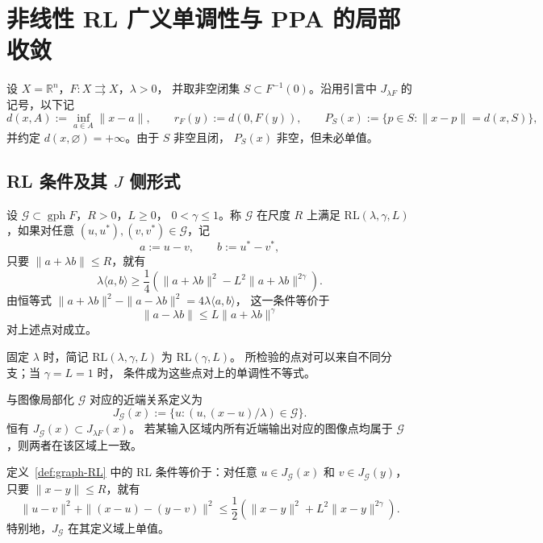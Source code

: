 \section{非线性 RL 广义单调性与 PPA 的局部收敛}
\label{sec:deterministic-rleb-spine}

设 $X=\mathbb R^n$，$F:X\rightrightarrows X$，$\lambda>0$，
并取非空闭集 $S\subset F^{-1}(0)$。沿用引言中
$J_{\lambda F}$ 的记号，以下记
\[
 d(x,A):=\inf_{a\in A}\|x-a\|,
 \qquad
 r_F(y):=d(0,F(y)),
 \qquad
 P_S(x):=\{p\in S:\|x-p\|=d(x,S)\},
\]
并约定 $d(x,\varnothing)=+\infty$。由于 $S$ 非空且闭，
$P_S(x)$ 非空，但未必单值。

\subsection{RL 条件及其 \texorpdfstring{$J$}{J} 侧形式}

\begin{definition}[RL 广义单调性]
\label{def:graph-RL}
设 $\mathcal G\subset\operatorname{gph}F$，$R>0$，$L\geq0$，
$0<\gamma\leq1$。称 $\mathcal G$ 在尺度 $R$ 上满足
$\mathrm{RL}(\lambda,\gamma,L)$，如果对任意
$(u,u^*),(v,v^*)\in\mathcal G$，记
\[
 a:=u-v,\qquad b:=u^*-v^*,
\]
只要 $\|a+\lambda b\|\leq R$，就有
\begin{equation}
\label{eq:graph-RL}
 \lambda\langle a,b\rangle
 \geq\frac14\left(
   \|a+\lambda b\|^2-L^2\|a+\lambda b\|^{2\gamma}
 \right).
\end{equation}
由恒等式
$\|a+\lambda b\|^2-\|a-\lambda b\|^2
 =4\lambda\langle a,b\rangle$，
这一条件等价于
\begin{equation}
\label{eq:power-RL}
 \|a-\lambda b\|\leq L\|a+\lambda b\|^\gamma
\end{equation}
对上述点对成立。
\end{definition}

固定 $\lambda$ 时，简记
$\mathrm{RL}(\lambda,\gamma,L)$ 为 $\mathrm{RL}(\gamma,L)$。
所检验的点对可以来自不同分支；当 $\gamma=L=1$ 时，
条件成为这些点对上的单调性不等式。

与图像局部化 $\mathcal G$ 对应的近端关系定义为
\[
 J_{\mathcal G}(x)
 :=\{u:(u,(x-u)/\lambda)\in\mathcal G\}.
\]
恒有 $J_{\mathcal G}(x)\subset J_{\lambda F}(x)$。
若某输入区域内所有近端输出对应的图像点均属于
$\mathcal G$，则两者在该区域上一致。

\begin{lemma}
\label{lem:minty-equivalence}
定义~\ref{def:graph-RL} 中的 RL 条件等价于：对任意
$u\in J_{\mathcal G}(x)$ 和 $v\in J_{\mathcal G}(y)$，
只要 $\|x-y\|\leq R$，就有
\begin{equation}
\label{eq:resolvent-energy-all-pairs}
 \|u-v\|^2+\|(x-u)-(y-v)\|^2
 \leq\frac12\left(
   \|x-y\|^2+L^2\|x-y\|^{2\gamma}
 \right).
\end{equation}
特别地，$J_{\mathcal G}$ 在其定义域上单值。
\end{lemma}

